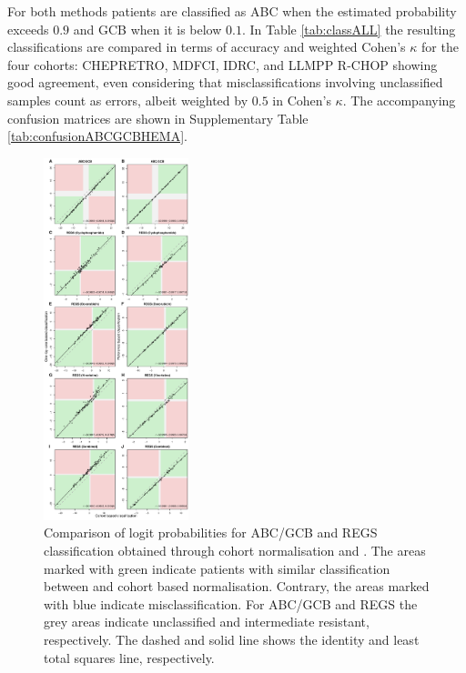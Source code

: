 \documentclass{article}
\begin{document}
For both methods patients are classified as ABC when the estimated probability exceeds $0.9$ and GCB when it is below $0.1$.
In Table \ref{tab:classALL} the resulting classifications are compared in terms of accuracy and weighted Cohen's $\kappa$ for the four cohorts: CHEPRETRO, MDFCI, IDRC, and LLMPP R-CHOP showing good agreement, even considering that misclassifications involving unclassified samples count as errors, albeit weighted by $0.5$ in Cohen's $\kappa$.
The accompanying confusion matrices are shown in Supplementary Table \ref{tab:confusionABCGCBHEMA}.



\begin{figure}
\begin{center}
\includegraphics[width=0.375\textwidth]{figures/figure2.pdf}
\end{center}
\caption{Comparison of logit probabilities for ABC/GCB and REGS classification obtained through cohort normalisation and \hemaClass{}.
The areas marked with green indicate patients with similar classification between \hemaClass{} and cohort based normalisation.
Contrary, the areas marked with blue indicate misclassification.
For ABC/GCB and REGS the grey areas indicate unclassified and intermediate resistant, respectively.
The dashed and solid line shows the identity and least total squares line, respectively.}
\label{fig:ABCGCBDrug}
\end{figure}
\end{document}
